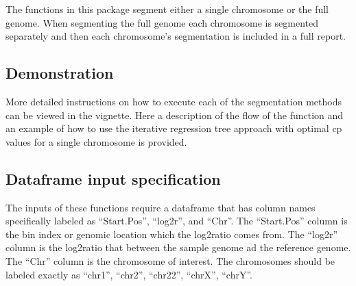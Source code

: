 \documentclass[
]{article}
\newenvironment{Shaded}{\begin{snugshade}}{\end{snugshade}}
\newcommand{\AttributeTok}[1]{\textcolor[rgb]{0.77,0.63,0.00}{#1}}
\newcommand{\FunctionTok}[1]{\textcolor[rgb]{0.00,0.00,0.00}{#1}}
\newcommand{\NormalTok}[1]{#1}
\newcommand{\OtherTok}[1]{\textcolor[rgb]{0.56,0.35,0.01}{#1}}
\newcommand{\SpecialCharTok}[1]{\textcolor[rgb]{0.00,0.00,0.00}{#1}}
\newcommand{\StringTok}[1]{\textcolor[rgb]{0.31,0.60,0.02}{#1}}
\begin{document}
The functions in this package segment either a single chromosome or the
full genome. When segmenting the full genome each chromosome is
segmented separately and then each chromosome's segmentation is included
in a full report.

\hypertarget{demonstration}{%
\subsection{Demonstration}\label{demonstration}}

More detailed instructions on how to execute each of the segmentation
methods can be viewed in the vignette. Here a description of the flow of
the function and an example of how to use the iterative regression tree
approach with optimal cp values for a single chromosome is provided.

\begin{Shaded}
\end{Shaded}

\hypertarget{dataframe-input-specification}{%
\subsection{Dataframe input
specification}\label{dataframe-input-specification}}

The inputs of these functions require a dataframe that has column names
specifically labeled as ``Start.Pos'', ``log2r'', and ``Chr''. The
``Start.Pos'' column is the bin index or genomic location which the
log2ratio comes from. The ``log2r'' column is the log2ratio that between
the sample genome ad the reference genome. The ``Chr'' column is the
chromosome of interest. The chromosomes should be labeled exactly as
``chr1'', ``chr2'', ``chr22'', ``chrX'', ``chrY''.
\end{document}
